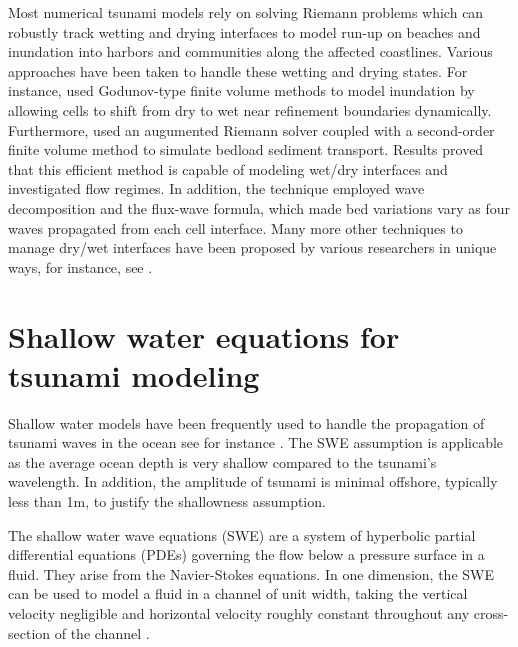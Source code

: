 \documentclass[10pt,a4paper]{article}
\begin{document}
				Most numerical tsunami models rely on solving Riemann problems which can robustly track wetting and drying interfaces to model run-up on beaches and inundation into harbors and communities along the affected coastlines.  Various approaches have been taken to handle these wetting and drying states. For instance, \citet{ge:2011,li-ta-wa-ca-ba-ch-li:2021,fivser2016mass} used Godunov-type finite volume methods to model inundation by allowing cells to shift from dry to wet near refinement boundaries dynamically. Furthermore, \citet{barzgaran2019numerical}  used an augumented Riemann solver coupled with a second-order finite volume method to simulate bedload sediment transport. Results proved that this efficient method is capable of modeling wet/dry interfaces and investigated flow regimes. In addition, the technique employed wave decomposition and the flux-wave formula, which made bed variations vary as four waves propagated from each cell interface. Many more other techniques to manage dry/wet interfaces have been proposed by various researchers in unique ways, for instance, see \citet{po:2015, po:2018, pe-bo-ma:2011, toro2001shock, chaabelasri1849simple,nikolos2009unstructured,huang2013well, bi2014finite,song2011unstructured,buttinger2019fast}.
		

	\section{Shallow water equations for tsunami modeling}
	\label{sec2}
	Shallow water models have been frequently used to handle the propagation of tsunami waves in the ocean see for instance \citet{dutykh2007water,le-ge-be:2011,dias2007dynamics}. The SWE assumption is applicable as the average ocean depth is very shallow compared to the tsunami's wavelength. In addition, the amplitude of tsunami is minimal offshore, typically less than 1m, to justify the shallowness assumption. 
	
		The shallow water wave equations (SWE) are a system of hyperbolic partial differential equations (PDEs) governing the flow below a pressure surface in a fluid. They arise from the Navier-Stokes equations.  In one dimension, the SWE  can be used to model a fluid in a channel of unit width, taking the vertical velocity negligible and horizontal velocity roughly constant throughout any cross-section of the channel \cite{ge:2008}.  
		
\end{document}
